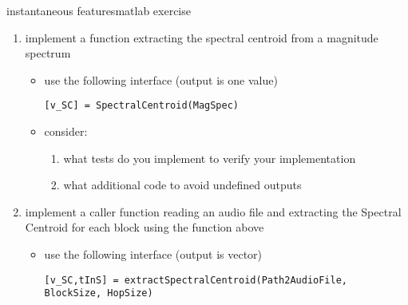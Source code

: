         \begin{frame}{instantaneous features}{matlab exercise}
            \begin{footnotesize}
            \begin{enumerate}
                \item   implement a function extracting the spectral centroid from a magnitude spectrum
                    \begin{itemize}
                        \item   use the following interface (output is one value)\\ \begin{scriptsize}\texttt{[v\_SC] = SpectralCentroid(MagSpec)}\end{scriptsize}
                        \item   consider:
                            \begin{enumerate}
                                \item   what tests do you implement to verify your implementation
                                \item   what additional code to avoid undefined outputs
                            \end{enumerate}
                    \end{itemize}
                \item   implement a caller function reading an audio file and extracting the Spectral Centroid for each block using the function above
                    \begin{itemize}
                        \item   use the following interface (output is vector)\\ \begin{scriptsize}\texttt{[v\_SC,tInS] = extractSpectralCentroid(Path2AudioFile, BlockSize, HopSize)}\end{scriptsize}
                    \end{itemize}
            \end{enumerate}
            \end{footnotesize}
       \end{frame}

